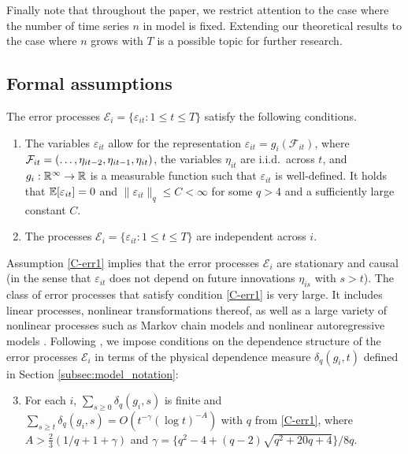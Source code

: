 \documentclass[12pt]{article}
\makeatletter
\renewcommand{\eqref}[1]{\tagform@{\ref{#1}}}
\makeatother
\begin{document}
Finally note that throughout the paper, we restrict attention to the case where the number of time series $n$ in model \eqref{eq:model_full} is fixed. Extending our theoretical results to the case where $n$ grows with $T$ is a possible topic for further research.


\subsection{Formal assumptions}\label{subsec:model_assumptions}


The error processes $\mathcal{E}_i = \{ \varepsilon_{it}: 1 \le t \le T\}$ satisfy the following conditions. 
\begin{enumerate}[label=(C\arabic*),leftmargin=1.05cm, itemsep=0pt, parsep=0pt, topsep=3pt]
\item \label{C-err1} 
The variables $\varepsilon_{it}$ allow for the representation $\varepsilon_{it} = g_i(\mathcal{F}_{it})$, where $\mathcal{F}_{it} = (\ldots,\eta_{it-2}, \linebreak \eta_{it-1},\eta_{it})$, the variables $\eta_{it}$ are i.i.d.\ across $t$, and $g_i: \mathbb{R}^\infty \rightarrow \mathbb{R}$ is a measurable function such that $\varepsilon_{it}$ is well-defined. It holds that $\mathbb{E}[\varepsilon_{it}] = 0$ and $\| \varepsilon_{it} \|_q \le C < \infty$ for some $q > 4$ and a sufficiently large constant $C$. 
\item \label{C-err2} The processes $\mathcal{E}_i = \{ \varepsilon_{it}: 1 \le t \le T\}$ are independent across $i$.
\end{enumerate}
Assumption \ref{C-err1} implies that the error processes $\mathcal{E}_i$ are stationary and causal (in the sense that $\varepsilon_{it}$ does not depend on future innovations $\eta_{is}$ with $s>t$). The class of error processes that satisfy condition \ref{C-err1} is very large. It includes linear processes, nonlinear transformations thereof, as well as a large variety of nonlinear processes such as Markov chain models and nonlinear autoregressive models \citep[][]{Wu2016}. Following \cite{Wu2005}, we impose conditions on the dependence structure of the error processes $\mathcal{E}_i$ in terms of the physical dependence measure $\delta_q(g_i, t)$ defined in Section \ref{subsec:model_notation}: 
\begin{enumerate}[label=(C\arabic*),leftmargin=1.05cm, itemsep=0pt, parsep=0pt, topsep=3pt]
\setcounter{enumi}{2}
\item \label{C-err3} For each $i$, $\sum\nolimits_{s \ge 0} \delta_q(g_i, s)$ is finite and $\sum\nolimits_{s \ge t} \delta_q(g_i, s) = O ( t^{-\gamma} (\log t)^{-A})$ with $q$ from \ref{C-err1}, where $A > \frac{2}{3} (1/q + 1 + \gamma)$ and $\gamma = \{q^2 - 4 + (q-2) \sqrt{q^2 + 20q + 4}\} / 8q$. 
\end{enumerate}
\end{document}

